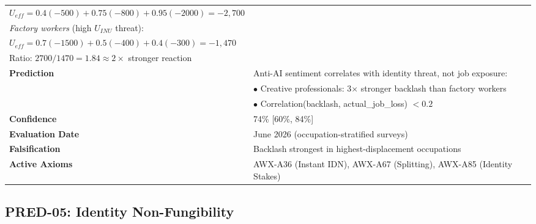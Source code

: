 \begin{table}[htbp]
\begin{tabular}{p{3cm}p{11cm}}
$U_{eff} = 0.4(-500) + 0.75(-800) + 0.95(-2000) = -2,700$ \\
\emph{Factory workers} (high $U_{INU}$ threat): \\
$U_{eff} = 0.7(-1500) + 0.5(-400) + 0.4(-300) = -1,470$ \\
Ratio: $2700/1470 = 1.84 \approx 2\times$ stronger reaction \\
\textbf{Prediction} & Anti-AI sentiment correlates with identity threat, not job exposure: \\
& $\bullet$ Creative professionals: 3$\times$ stronger backlash than factory workers \\
& $\bullet$ Correlation(backlash, actual\_job\_loss) $< 0.2$ \\
\textbf{Confidence} & 74\% [60\%, 84\%] \\
\textbf{Evaluation Date} & June 2026 (occupation-stratified surveys) \\
\textbf{Falsification} & Backlash strongest in highest-displacement occupations \\
\textbf{Active Axioms} & AWX-A36 (Instant IDN), AWX-A67 (Splitting), AWX-A85 (Identity Stakes) \\
\bottomrule
\end{tabular}
\end{table}


\subsection{PRED-05: Identity Non-Fungibility}
\label{subsec:pred-05-calc}


